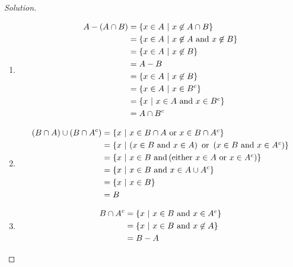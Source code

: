\documentclass[12pt,letterpaper,reqno]{amsart}
\numberwithin{equation}{subsection}
\begin{document}
\begin{proof}[Solution]~\\

\begin{enumerate}[label = (\alph*), leftmargin=*]
    \item 
    
    \begin{align*}
        A - (A \cap B) &= \left\{ {x \in A} \ \middle| \ {x \not\in A \cap B} \right\} \\
                       &= \left\{ {x \in A} \ \middle| \ {\mbox{$x \not\in A$ and $x \not\in B$}} \right\} \\
                       &= \left\{ {x \in A} \ \middle| \ {x \not\in B} \right\} \\
                       &= A - B \\
                       &= \left\{ {x \in A} \ \middle| \ {x \not\in B} \right\} \\
                       &= \left\{ {x \in A} \ \middle| \ {x \in B^c} \right\} \\
                       &= \left\{ {x} \ \middle| \ {\mbox{$x \in A$ and $x \in B^c$}} \right\} \\
                       &= A \cap B^c
    \end{align*}
    
    \item
    
    \begin{align*}
        (B \cap A) \cup (B \cap A^c) &= \SET{x}{\mbox{$x \in B \cap A$ or $x \in B \cap A^c$}} \\
        &= \SET{x}{\left(\mbox{$x \in B$ and $x \in A$} \right) \ \mbox{or} \ \left(\mbox{$x \in B$ and $x \in A^c$} \right)} \\
        &= \SET{x}{x \in B \ \mbox{and} \left( \mbox{either $x \in A$ or $x \in A^c$} \right)} \\
        &= \SET{x}{x \in B \ \mbox{and} \ x \in A \cup A^c} \\
        &= \SET{x}{x \in B} \\
        &= B
    \end{align*}
    
    \item
    
    \begin{align*}
        B \cap A^c &= \left\{ {x} \ \middle| \ {\mbox{$x \in B$ and $x \in A^c$}} \right\} \\
                   &= \left\{ {x} \ \middle| \ {\mbox{$x \in B$ and $x \not\in A$}} \right\} \\
                   &= B-A
    \end{align*}
    

\end{enumerate}
\end{proof}
\end{document}
